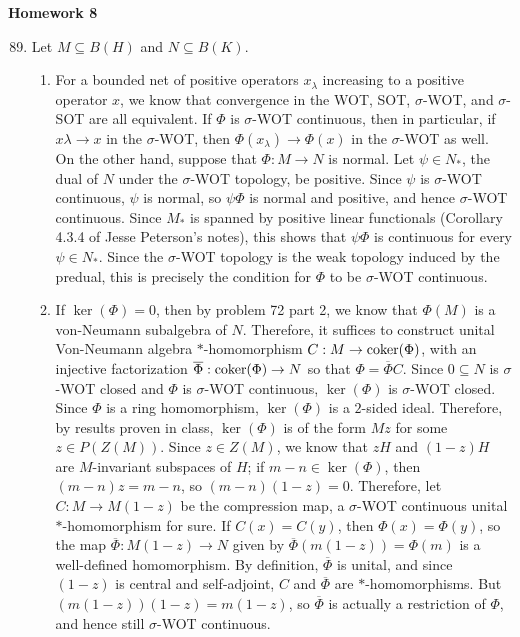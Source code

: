 \documentclass[a4paper,10pt]{report}
\newcommand{\ol}[1]{\overline{#1}}
\begin{document}

\pagestyle{fancy}	
\fancyhf{} %
\setlength{\headheight}{60pt}

\begin{center}
	\textbf{Homework 8}
\end{center}

\begin{enumerate}
		\setcounter{enumi}{88}
	\item Let $M\subseteq B(H)$ and $N\subseteq B(K)$. 
		\begin{enumerate}
			\item For a bounded net of positive operators $x_\lambda$ increasing to a positive operator $x$, we know that convergence in the WOT, SOT, $\sigma$-WOT, and $\sigma$-SOT are all equivalent. If $\Phi$ is $\sigma$-WOT continuous, then in particular, if $x\lambda\to x$ in the $\sigma$-WOT, then $\Phi(x_\lambda)\to\Phi(x)$ in the $\sigma$-WOT as well. On the other hand, suppose that $\Phi:M\to N$ is normal. Let $\psi\in N_*$, the dual of $N$ under the $\sigma$-WOT topology, be positive. Since $\psi$ is $\sigma$-WOT continuous, $\psi$ is normal, so $\psi\Phi$ is normal and positive, and hence $\sigma$-WOT continuous. Since $M_*$ is spanned by positive linear functionals (Corollary 4.3.4 of Jesse Peterson's notes), %
				this shows that $\psi\Phi$ is continuous for every $\psi\in N_*$. Since the $\sigma$-WOT topology is the weak topology induced by the predual, this is precisely the condition for $\Phi$ to be $\sigma$-WOT continuous. 
			\item If $\ker(\Phi)=0$, then by problem 72 part 2, we know that $\Phi(M)$ is a von-Neumann subalgebra of $N$. Therefore, it suffices to construct  unital Von-Neumann algebra $*$-homomorphism $C:M\to\operatorname{coker}(\Phi)$, with an injective factorization $\ol{\Phi}:\coker(\Phi)\to N$ so that $\Phi=\ol{\Phi}C$. Since $0\subseteq N$ is $\sigma$-WOT closed and $\Phi$ is $\sigma$-WOT continuous, $\ker(\Phi)$ is $\sigma$-WOT closed. Since $\Phi$ is a ring homomorphism, $\ker(\Phi)$ is a $2$-sided ideal. Therefore, by results proven in class, $\ker(\Phi)$ is of the form $Mz$ for some $z\in P(Z(M))$. Since $z\in Z(M)$, we know that $zH$ and $(1-z)H$ are $M$-invariant subspaces of $H$; if $m-n\in\ker(\Phi)$, then $(m-n)z=m-n$, so $(m-n)(1-z)=0$. Therefore, let $C:M\to M(1-z)$ be the compression map, a $\sigma$-WOT continuous unital $*$-homomorphism for sure. If $C(x)=C(y)$, then $\Phi(x)=\Phi(y)$, so the map $\ol{\Phi}:M(1-z)\to N$ given by $\ol{\Phi}(m(1-z))=\Phi(m)$ is a well-defined homomorphism. By definition, $\ol{\Phi}$ is unital, and since $(1-z)$ is central and self-adjoint, $C$ and $\ol{\Phi}$ are $*$-homomorphisms. But $(m(1-z))(1-z)=m(1-z)$, so $\ol{\Phi}$ is actually a restriction of $\Phi$, and hence still $\sigma$-WOT continuous. 


\end{enumerate}
\end{enumerate}
\end{document}
